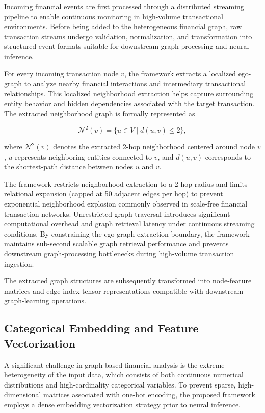 \documentclass[conference]{IEEEtran}
\begin{document}
Incoming financial events are first processed through a distributed streaming pipeline to enable continuous monitoring in high-volume transactional environments. Before being added to the heterogeneous financial graph, raw transaction streams undergo validation, normalization, and transformation into structured event formats suitable for downstream graph processing and neural inference.

For every incoming transaction node \(v\), the framework extracts a localized ego-graph to analyze nearby financial interactions and intermediary transactional relationships. This localized neighborhood extraction helps capture surrounding entity behavior and hidden dependencies associated with the target transaction. The extracted neighborhood graph is formally represented as

\[
\mathcal{N}^{2}(v)=
\{u \in V \mid d(u,v)\leq 2\},
\]

where \(\mathcal{N}^{2}(v)\) denotes the extracted 2-hop neighborhood centered around node \(v\), \(u\) represents neighboring entities connected to \(v\), and \(d(u,v)\) corresponds to the shortest-path distance between nodes \(u\) and \(v\).

The framework restricts neighborhood extraction to a 2-hop radius and limits relational expansion (capped at 50 adjacent edges per hop) to prevent exponential neighborhood explosion commonly observed in scale-free financial transaction networks. Unrestricted graph traversal introduces significant computational overhead and graph retrieval latency under continuous streaming conditions. By constraining the ego-graph extraction boundary, the framework maintains sub-second scalable graph retrieval performance and prevents downstream graph-processing bottlenecks during high-volume transaction ingestion.

The extracted graph structures are subsequently transformed into node-feature matrices and edge-index tensor representations compatible with downstream graph-learning operations.

\subsection{\textbf{Categorical Embedding and Feature Vectorization}}

A significant challenge in graph-based financial analysis is the extreme heterogeneity of the input data, which consists of both continuous numerical distributions and high-cardinality categorical variables. To prevent sparse, high-dimensional matrices associated with one-hot encoding, the proposed framework employs a dense embedding vectorization strategy prior to neural inference.
\end{document}
